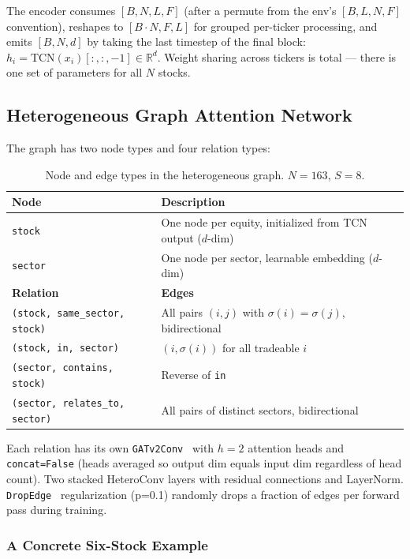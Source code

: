 \documentclass[11pt,a4paper]{article}
\begin{document}
The encoder consumes $[B, N, L, F]$ (after a permute from the env's
$[B, L, N, F]$ convention), reshapes to $[B \cdot N, F, L]$ for grouped per-ticker
processing, and emits $[B, N, d]$ by taking the last timestep of the final block:
$h_i = \text{TCN}(x_i)[:,:,-1] \in \mathbb{R}^d$. Weight sharing across tickers is
total --- there is one set of parameters for all $N$ stocks.

\subsection{Heterogeneous Graph Attention Network}

The graph has two node types and four relation types:

\begin{table}[h]
\centering
\caption{Node and edge types in the heterogeneous graph. $N = 163$, $S = 8$.}
\small
\begin{tabularx}{\textwidth}{l X}
\toprule
\textbf{Node} & \textbf{Description} \\
\midrule
\texttt{stock} & One node per equity, initialized from TCN output ($d$-dim) \\
\texttt{sector} & One node per sector, learnable embedding ($d$-dim) \\
\midrule
\textbf{Relation} & \textbf{Edges} \\
\midrule
\texttt{(stock, same\_sector, stock)} & All pairs $(i, j)$ with $\sigma(i) = \sigma(j)$, bidirectional \\
\texttt{(stock, in, sector)} & $(i, \sigma(i))$ for all tradeable $i$ \\
\texttt{(sector, contains, stock)} & Reverse of \texttt{in} \\
\texttt{(sector, relates\_to, sector)} & All pairs of distinct sectors, bidirectional \\
\bottomrule
\end{tabularx}
\end{table}

Each relation has its own \texttt{GATv2Conv}~\cite{brody2022gatv2} with $h = 2$
attention heads and \texttt{concat=False} (heads averaged so output dim equals input
dim regardless of head count). Two stacked HeteroConv layers with residual connections
and LayerNorm. \texttt{DropEdge}~\cite{rong2020dropedge} regularization (p=0.1)
randomly drops a fraction of edges per forward pass during training.

\subsubsection{A Concrete Six-Stock Example}
\end{document}
